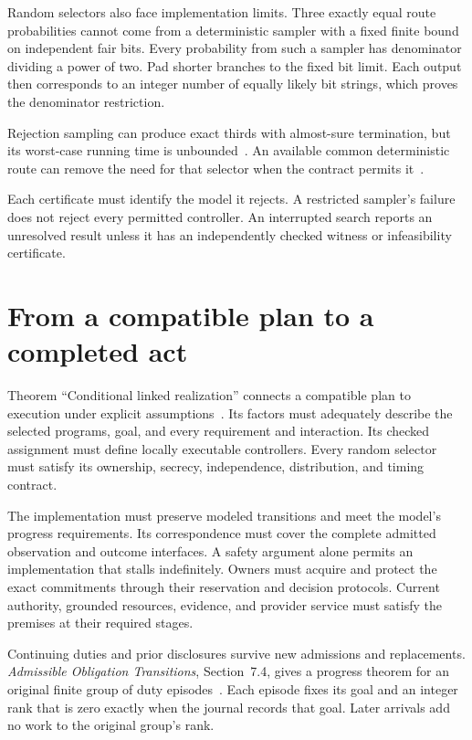 \documentclass{momentum}
\begin{document}
Random selectors also face implementation limits.
Three exactly equal route probabilities cannot come from a deterministic sampler with a fixed finite bound on independent fair bits.
Every probability from such a sampler has denominator dividing a power of two.
Pad shorter branches to the fixed bit limit.
Each output then corresponds to an integer number of equally likely bit strings, which proves the denominator restriction.

Rejection sampling can produce exact thirds with almost-sure termination, but its worst-case running time is unbounded~\cite[Section~18]{linking}.
An available common deterministic route can remove the need for that selector when the contract permits it~\cite[Section~23]{linking}.

Each certificate must identify the model it rejects.
A restricted sampler's failure does not reject every permitted controller.
An interrupted search reports an unresolved result unless it has an independently checked witness or infeasibility certificate.

\section{From a compatible plan to a completed act}
\label{sec:realization}

Theorem ``Conditional linked realization'' connects a compatible plan to execution under explicit assumptions~\cite[Section~25]{linking}.
Its factors must adequately describe the selected programs, goal, and every requirement and interaction.
Its checked assignment must define locally executable controllers.
Every random selector must satisfy its ownership, secrecy, independence, distribution, and timing contract.

The implementation must preserve modeled transitions and meet the model's progress requirements.
Its correspondence must cover the complete admitted observation and outcome interfaces.
A safety argument alone permits an implementation that stalls indefinitely.
Owners must acquire and protect the exact commitments through their reservation and decision protocols.
Current authority, grounded resources, evidence, and provider service must satisfy the premises at their required stages.

Continuing duties and prior disclosures survive new admissions and replacements.
\emph{Admissible Obligation Transitions}, Section~7.4, gives a progress theorem for an original finite group of duty episodes~\cite{transitions}.
Each episode fixes its goal and an integer rank that is zero exactly when the journal records that goal.
Later arrivals add no work to the original group's rank.
\end{document}
